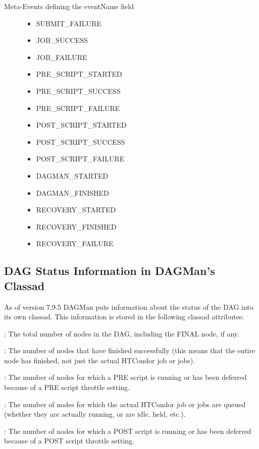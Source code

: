 \begin{description}
\item[Meta-Events defining the eventName field]
\begin{itemize}
\item SUBMIT\_FAILURE
\item JOB\_SUCCESS
\item JOB\_FAILURE
\item PRE\_SCRIPT\_STARTED
\item PRE\_SCRIPT\_SUCCESS
\item PRE\_SCRIPT\_FAILURE
\item POST\_SCRIPT\_STARTED
\item POST\_SCRIPT\_SUCCESS
\item POST\_SCRIPT\_FAILURE
\item DAGMAN\_STARTED
\item DAGMAN\_FINISHED
\item RECOVERY\_STARTED
\item RECOVERY\_FINISHED
\item RECOVERY\_FAILURE
\end{itemize}
\end{description}


\subsection{\label{sec:DAGStatusClassad}DAG Status Information in DAGMan's Classad}

As of version 7.9.5 DAGMan puts information about the status of the DAG
into its own classad.  This information is stored in the following classad
attributes:

:  The total number of nodes in the DAG, including
the FINAL node, if any.

:  The number of nodes that have finished successfully
(this means that the entire node has finished, not just the actual HTCondor
job or jobs).

:  The number of nodes for which a PRE script is
running or has been deferred because of a PRE script throttle setting.

:  The number of nodes for which the actual HTCondor
job or jobs are queued (whether they are actually running, or are idle,
held, etc.).

:  The number of nodes for which a POST script is
running or has been deferred because of a POST script throttle setting.

